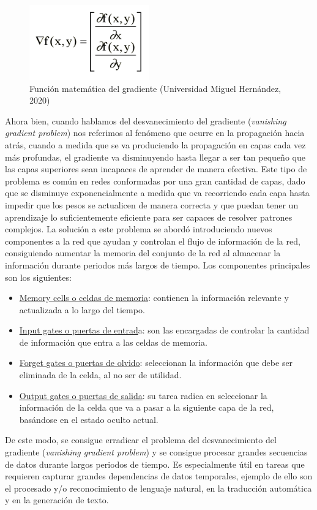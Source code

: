\begin{figure}[h]
	\centering
	\includegraphics[width = 0.3 \textwidth]{Imagenes/Vectorial/gradiente.png}
	\caption{Función matemática del gradiente (Universidad Miguel Hernández, 2020)}
	\label{fig:gradiente}
\end{figure}

Ahora bien, cuando hablamos del desvanecimiento del gradiente (\textit{vanishing gradient problem}) nos referimos al fenómeno que ocurre en la propagación hacia atrás, cuando a medida que se va produciendo la propagación en capas cada vez más profundas, el gradiente va disminuyendo hasta llegar a ser tan pequeño que las capas superiores sean incapaces de aprender de manera efectiva. Este tipo de problema es común en redes conformadas por una gran cantidad de capas, dado que se disminuye exponencialmente a medida que va recorriendo cada capa hasta impedir que los pesos se actualicen de manera correcta y que puedan tener un aprendizaje lo suficientemente eficiente para ser capaces de resolver patrones complejos.
La solución a este problema se abordó introduciendo nuevos componentes a la red que ayudan y controlan el flujo de información de la red, consiguiendo aumentar la memoria del conjunto de la red al almacenar la información durante periodos más largos de tiempo. Los componentes principales son los siguientes:
\begin{itemize}
	\item \underline{Memory cells o celdas de memoria}: contienen la información relevante  y actualizada a lo largo del tiempo.
	\item \underline{Input gates o puertas de entrad}a: son las encargadas de controlar la cantidad de información que entra a las celdas de memoria.
	\item \underline{Forget gates o puertas de olvido}: seleccionan la información que debe ser eliminada de la celda, al no ser de utilidad.
	\item \underline{Output gates o puertas de salida}: su tarea radica en seleccionar la información de la celda que va a pasar a la siguiente capa de la red, basándose en el estado oculto actual.
\end{itemize}
 

De este modo, se consigue erradicar el problema del desvanecimiento del gradiente (\textit{vanishing gradient problem}) y se consigue procesar grandes secuencias de datos durante largos periodos de tiempo. Es especialmente útil en tareas que requieren capturar grandes dependencias de datos temporales, ejemplo de ello son el procesado y/o reconocimiento de lenguaje natural, en la traducción automática y en la generación de texto.\\

